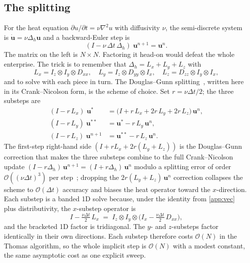 \documentclass[11pt]{article}
\newcommand{\kron}{\otimes}
\newcommand{\Dxx}{D_{xx}}
\newcommand{\Dyy}{D_{yy}}
\newcommand{\Dzz}{D_{zz}}
\newcommand{\Ix}{I_{x}}
\newcommand{\Iy}{I_{y}}
\newcommand{\Iz}{I_{z}}
\newcommand{\dt}{\Delta t}
\newcommand{\bigO}{\mathcal{O}}
\newcommand{\Lap}{\Delta_h}
\newcommand{\Nall}{N}
\begin{document}
\subsection{The splitting}

For the heat equation
$\partial u/\partial t = \nu \nabla^2 u$ with diffusivity $\nu$,
the semi-discrete system is $\dot{\bm{u}} = \nu\Lap\bm{u}$ and a
backward-Euler step is
\begin{equation}
\label{eq:backward-euler}
  (I - \nu\,\dt\,\Lap)\;\bm{u}^{n+1} = \bm{u}^n.
\end{equation}
The matrix on the left is $\Nall \times \Nall$.  Factoring it head-on
would defeat the whole enterprise.  The trick is to remember that
$\Lap = L_x + L_y + L_z$ with
\begin{equation}
  L_x = \Iz \kron \Iy \kron \Dxx, \quad
  L_y = \Iz \kron \Dyy \kron \Ix, \quad
  L_z = \Dzz \kron \Iy \kron \Ix,
\end{equation}
and to solve with each piece in turn.  The Douglas--Gunn
splitting~\citep{douglas1964numerical}, written here in its
Crank--Nicolson form, is the scheme of choice.  Set $r = \nu\dt/2$;
the three substeps are
\begin{align}
  (I - r\,L_x)\;\bm{u}^*
  &= \bigl(I + r\,L_x + 2r\,L_y + 2r\,L_z\bigr)\,\bm{u}^n,
  \label{eq:adi-x} \\
  (I - r\,L_y)\;\bm{u}^{**}
  &= \bm{u}^* - r\,L_y\,\bm{u}^n,
  \label{eq:adi-y} \\
  (I - r\,L_z)\;\bm{u}^{n+1}
  &= \bm{u}^{**} - r\,L_z\,\bm{u}^n.
  \label{eq:adi-z}
\end{align}
The first-step right-hand side $(I + r L_x + 2r(L_y + L_z))$ is the
Douglas--Gunn correction that makes the three substeps combine to
the full Crank--Nicolson update $(I - r\Lap)\,\bm{u}^{n+1} = (I + r\Lap)\,\bm{u}^n$
modulo a splitting error of order $\bigO((\nu\dt)^3)$ per
step~\citep{douglas1964numerical}; dropping the $2r(L_y + L_z)\,\bm{u}^n$
correction collapses the scheme to $\bigO(\dt)$ accuracy and biases
the heat operator toward the $x$-direction.  Each substep is a banded
1D solve because, under the identity from \cref{app:vec} plus
distributivity, the $x$-substep operator is
\begin{equation}
  I - \tfrac{\nu\dt}{2}\,L_x
  \;=\;
  \Iz \kron \Iy \kron \bigl(\Ix - \tfrac{\nu\dt}{2}\,\Dxx\bigr),
\end{equation}
and the bracketed 1D factor is tridiagonal.  The $y$- and
$z$-substeps factor identically in their own directions.  Each
substep therefore costs $\bigO(\Nall)$ in the Thomas algorithm, so
the whole implicit step is $\bigO(\Nall)$ with a modest constant,
the same asymptotic cost as one explicit sweep.
\end{document}
